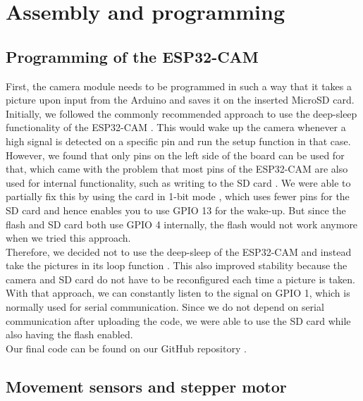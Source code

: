 \documentclass{article}
\begin{document}
\newpage
\section{Assembly and programming}

\subsection{Programming of the ESP32-CAM}
First, the camera module needs to be programmed in such a way that it takes a picture upon input from the Arduino and saves it on the inserted MicroSD card. \\
Initially, we followed the commonly recommended approach to use the deep-sleep functionality of the ESP32-CAM \cite{esp_cam_start}. This would wake up the camera whenever a high signal is detected on a specific pin and run the setup function in that case. However, we found that only pins on the left side of the board can be used for that, which came with the problem that most pins of the ESP32-CAM are also used for internal functionality, such as writing to the SD card \cite{esp_cam_pins}. We were able to partially fix this by using the card in 1-bit mode \cite{esp_cam_1bit}, which uses fewer pins for the SD card and hence enables you to use GPIO 13 for the wake-up. But since the flash and SD card both use GPIO 4 internally, the flash would not work anymore when we tried this approach. \\
Therefore, we decided not to use the deep-sleep of the ESP32-CAM and instead take the pictures in its loop function \cite{esp_cam_loop}.
This also improved stability because the camera and SD card do not have to be reconfigured each time a picture is taken.
With that approach, we can constantly listen to the signal on GPIO 1, which is normally used for serial communication. Since we do not depend on serial communication after uploading the code, we were able to use the SD card while also having the flash enabled. \\
Our final code can be found on our GitHub repository \cite{github}.

\subsection{Movement sensors and stepper motor}
\end{document}
